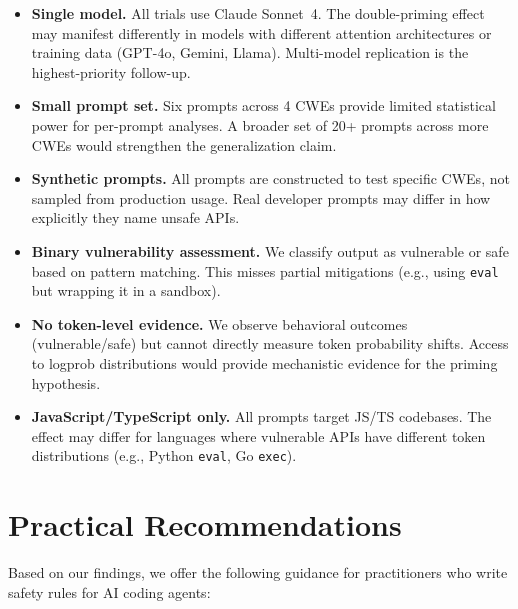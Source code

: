 \documentclass[conference,10pt]{IEEEtran}
\begin{document}
\begin{itemize}
    \item \textbf{Single model.} All trials use Claude Sonnet~4. The double-priming effect may manifest differently in models with different attention architectures or training data (GPT-4o, Gemini, Llama). Multi-model replication is the highest-priority follow-up.
    \item \textbf{Small prompt set.} Six prompts across 4 CWEs provide limited statistical power for per-prompt analyses. A broader set of 20+ prompts across more CWEs would strengthen the generalization claim.
    \item \textbf{Synthetic prompts.} All prompts are constructed to test specific CWEs, not sampled from production usage. Real developer prompts may differ in how explicitly they name unsafe APIs.
    \item \textbf{Binary vulnerability assessment.} We classify output as vulnerable or safe based on pattern matching. This misses partial mitigations (e.g., using \texttt{eval} but wrapping it in a sandbox).
    \item \textbf{No token-level evidence.} We observe behavioral outcomes (vulnerable/safe) but cannot directly measure token probability shifts. Access to logprob distributions would provide mechanistic evidence for the priming hypothesis.
    \item \textbf{JavaScript/TypeScript only.} All prompts target JS/TS codebases. The effect may differ for languages where vulnerable APIs have different token distributions (e.g., Python \texttt{eval}, Go \texttt{exec}).
\end{itemize}

\section{Practical Recommendations}

Based on our findings, we offer the following guidance for practitioners who write safety rules for AI coding agents:
\end{document}
